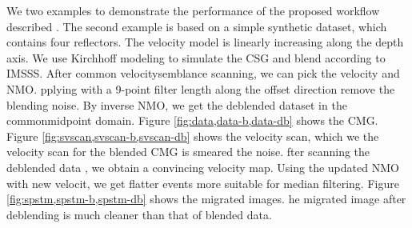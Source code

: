 We  two examples to demonstrate the performance of the proposed workflow described . 
The second example is based on a simple synthetic dataset, which contains four reflectors. The velocity  model is linearly increasing along the depth axis. We use Kirchhoff modeling to simulate the CSG and blend  according to IMSSS. After  common velocity\new{-}semblance scanning, we can pick the  velocity and  NMO. pplying   with a 9-point filter length along the offset direction remove the blending noise. By inverse NMO, we get the deblended dataset in the common\new{-}midpoint domain.  Figure \ref{fig:data,data-b,data-db} shows the  CMG. Figure \ref{fig:svscan,svscan-b,svscan-db} shows the  velocity scan,  which we  the velocity scan for the blended CMG is  smeared  the noise. fter scanning the  deblended data , we  obtain a convincing velocity map. Using the updated NMO with new velocit, we  get flatter events  more suitable for median filtering.  Figure \ref{fig:spstm,spstm-b,spstm-db} shows the  migrated images.  he migrated image after deblending is much cleaner than that of  blended data. 




